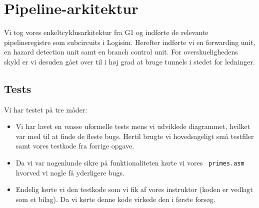 \section{Pipeline-arkitektur}

Vi tog vores enkeltcyklusarkitektur fra G1 og indførte de relevante
pipelineregistre som subcircuits i Logisim. Herefter indførte vi en
forwarding unit, en hazard detection unit samt en branch control unit. For
overskuelighedens skyld er vi desuden gået over til i høj grad at bruge tunnels
i stedet for ledninger.

\subsection{Tests}
Vi har testet på tre måder:
\begin{itemize}
\item Vi har lavet en {\emph masse} uformelle tests mens vi udviklede
diagrammet, hvilket var med til at finde de fleste bugs. Hertil brugte vi
hovedsageligt små testfiler samt vores testkode fra forrige opgave.
\item Da vi var nogenlunde sikre på funktionaliteten kørte vi vores {\tt
primes.asm} hvorved vi nogle få yderligere bugs.
\item Endelig kørte vi den testkode som vi fik af vores instruktor (koden er
vedlagt som et bilag). Da vi kørte denne kode virkede den i første forsøg.
\end{itemize}
